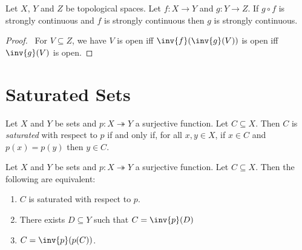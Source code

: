\begin{proposition}
    \label{proposition:strongly_continuous_strongly_continuous}
    Let $X$, $Y$ and $Z$ be topological spaces.
    Let $f : X \rightarrow Y$ and $g : Y \rightarrow Z$.
    If $g \circ f$ is strongly continuous and $f$ is strongly continuous then 
    $g$ is strongly continuous.
\end{proposition}

\begin{proof}
    \pf\ For $V \subseteq Z$, we have $V$ is open iff $\inv{f}(\inv{g}(V))$ is
    open iff $\inv{g}(V)$ is open.
\end{proof}

\section{Saturated Sets}

\begin{definition}
    Let $X$ and $Y$ be sets and $p : X \twoheadrightarrow Y$ a surjective function. Let $C \subseteq X$. Then $C$ is \emph{saturated} with respect to $p$ if and only if, for all
    $x, y \in X$, if $x \in C$ and $p(x) = p(y)$ then $y \in C$.
\end{definition}

\begin{proposition}
    \label{proposition:saturated}
    Let $X$ and $Y$ be sets and $p : X \twoheadrightarrow Y$ a surjective function. Let $C \subseteq X$. Then the following are equivalent:
    \begin{enumerate}
        \item $C$ is saturated with respect to $p$.
        \item There exists $D \subseteq Y$ such that $C = \inv{p}(D)$
        \item $C = \inv{p}(p(C))$.
    \end{enumerate}
\end{proposition}


